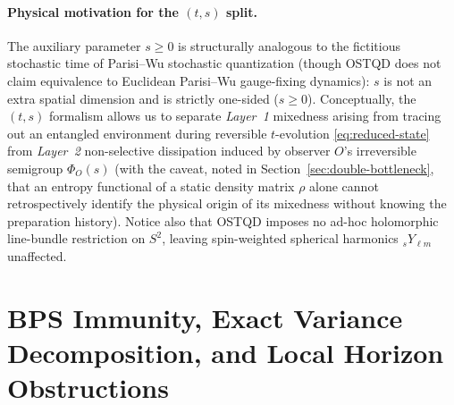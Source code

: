 \documentclass[11pt,a4paper]{article}
\theoremstyle{definition}
\theoremstyle{remark}
\newcommand{\1}{\mathbf{1}}
\begin{document}
\paragraph{Physical motivation for the $(t,s)$ split.}
The auxiliary parameter $s \ge 0$ is structurally analogous to the fictitious stochastic time of Parisi--Wu stochastic quantization \cite{ParisiWu1981} (though OSTQD does not claim equivalence to Euclidean Parisi--Wu gauge-fixing dynamics): $s$ is not an extra spatial dimension and is strictly one-sided ($s \ge 0$). Conceptually, the $(t,s)$ formalism allows us to separate \emph{Layer~1} mixedness arising from tracing out an entangled environment during reversible $t$-evolution \eqref{eq:reduced-state} from \emph{Layer~2} non-selective dissipation induced by observer $O$'s irreversible semigroup $\Phi_O(s)$ (with the caveat, noted in Section~\ref{sec:double-bottleneck}, that an entropy functional of a static density matrix $\rho$ alone cannot retrospectively identify the physical origin of its mixedness without knowing the preparation history). Notice also that OSTQD imposes no ad-hoc holomorphic line-bundle restriction on $S^2$, leaving spin-weighted spherical harmonics ${}_s Y_{\ell m}$ \cite{NewmanPenrose1966} unaffected.

\section{BPS Immunity, Exact Variance Decomposition, and Local Horizon Obstructions}\label{sec:horizon}
\end{document}
